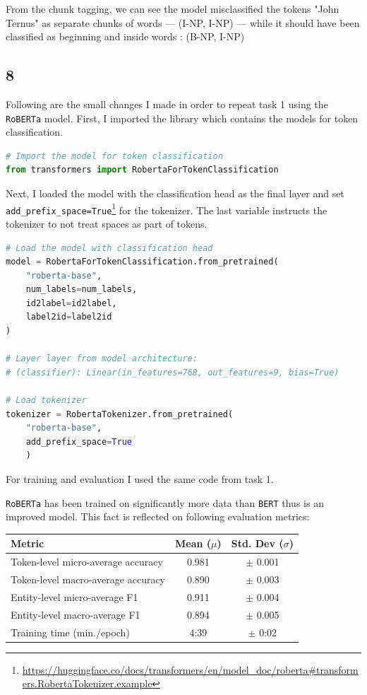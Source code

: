\documentclass[12pt,a4paper]{report}%
\begin{document}
From the chunk tagging, we can see the model misclassified the tokens "John Ternus" as separate chunks of words --- (I-NP, I-NP) --- while it should have been classified as beginning and inside words : (B-NP, I-NP)



\subsection*{8}

Following are the small changes I made in order to repeat task 1 using the \lstinline{RoBERTa} model. First, I imported the library which contains the models for token classification.

\begin{lstlisting}[language=Python]
# Import the model for token classification
from transformers import RobertaForTokenClassification
\end{lstlisting}

Next, I loaded the model with the classification head as the final layer and set \lstinline{add_prefix_space=True}\footnote{\url{https://huggingface.co/docs/transformers/en/model_doc/roberta\#transformers.RobertaTokenizer.example}} for the tokenizer. The last variable instructs the tokenizer to not treat spaces as part of tokens.

\begin{lstlisting}[language=Python]
# Load the model with classification head
model = RobertaForTokenClassification.from_pretrained(
    "roberta-base",
    num_labels=num_labels,
    id2label=id2label,
    label2id=label2id
)

# Layer layer from model architecture:
# (classifier): Linear(in_features=768, out_features=9, bias=True)

# Load tokenizer
tokenizer = RobertaTokenizer.from_pretrained(
    "roberta-base",
    add_prefix_space=True
    )
\end{lstlisting}

For training and evaluation I used the same code from task 1.

\lstinline{RoBERTa} has been trained on significantly more data than \lstinline{BERT} thus is an improved model. This fact is reflected on following evaluation metrics:

\begin{table}[h]
\centering
\begin{tabular}{|p{6.5cm}|c|c|}
\hline
\textbf{Metric} & \textbf{Mean ($\mu$)} & \textbf{Std. Dev ($\sigma$)} \\ \hline
Token-level micro-average accuracy & 0.981 & $\pm$ 0.001 \\ \hline
Token-level macro-average accuracy & 0.890 & $\pm$ 0.003 \\ \hline
Entity-level micro-average F1      & 0.911 & $\pm$ 0.004 \\ \hline
Entity-level macro-average F1      & 0.894 & $\pm$ 0.005 \\ \hline
Training time (min./epoch)         & 4:39  & $\pm$ 0:02  \\ \hline
\end{tabular}
\end{table}
\end{document}
